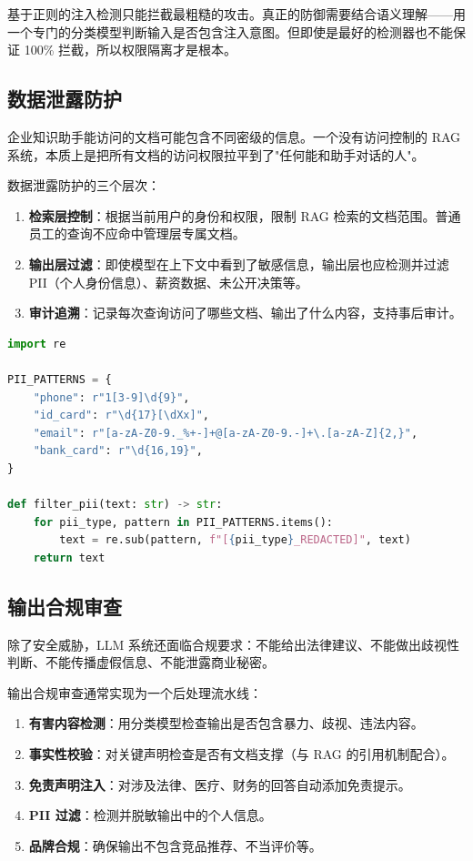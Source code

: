 \begin{note}
基于正则的注入检测只能拦截最粗糙的攻击。真正的防御需要结合语义理解——用一个专门的分类模型判断输入是否包含注入意图。但即使是最好的检测器也不能保证 100\% 拦截，所以权限隔离才是根本。
\end{note}

\subsection{数据泄露防护}
企业知识助手能访问的文档可能包含不同密级的信息。一个没有访问控制的 RAG 系统，本质上是把所有文档的访问权限拉平到了"任何能和助手对话的人"。

数据泄露防护的三个层次：

\begin{enumerate}
  \item \textbf{检索层控制}：根据当前用户的身份和权限，限制 RAG 检索的文档范围。普通员工的查询不应命中管理层专属文档。
  \item \textbf{输出层过滤}：即使模型在上下文中看到了敏感信息，输出层也应检测并过滤 PII（个人身份信息）、薪资数据、未公开决策等。
  \item \textbf{审计追溯}：记录每次查询访问了哪些文档、输出了什么内容，支持事后审计。
\end{enumerate}

\begin{lstlisting}[language=Python]
import re

PII_PATTERNS = {
    "phone": r"1[3-9]\d{9}",
    "id_card": r"\d{17}[\dXx]",
    "email": r"[a-zA-Z0-9._%+-]+@[a-zA-Z0-9.-]+\.[a-zA-Z]{2,}",
    "bank_card": r"\d{16,19}",
}

def filter_pii(text: str) -> str:
    for pii_type, pattern in PII_PATTERNS.items():
        text = re.sub(pattern, f"[{pii_type}_REDACTED]", text)
    return text
\end{lstlisting}

\subsection{输出合规审查}
除了安全威胁，LLM 系统还面临合规要求：不能给出法律建议、不能做出歧视性判断、不能传播虚假信息、不能泄露商业秘密。

输出合规审查通常实现为一个后处理流水线：

\begin{enumerate}
  \item \textbf{有害内容检测}：用分类模型检查输出是否包含暴力、歧视、违法内容。
  \item \textbf{事实性校验}：对关键声明检查是否有文档支撑（与 RAG 的引用机制配合）。
  \item \textbf{免责声明注入}：对涉及法律、医疗、财务的回答自动添加免责提示。
  \item \textbf{PII 过滤}：检测并脱敏输出中的个人信息。
  \item \textbf{品牌合规}：确保输出不包含竞品推荐、不当评价等。
\end{enumerate}

